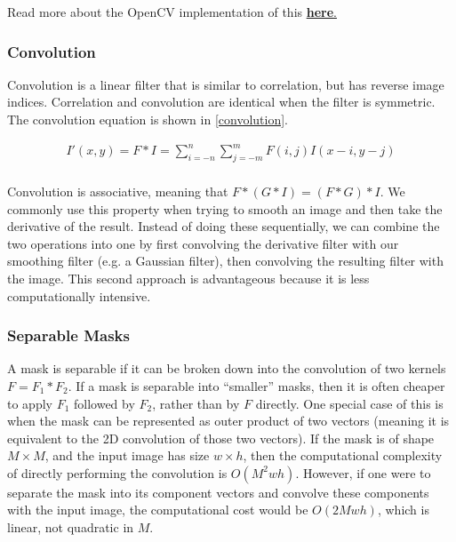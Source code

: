 \documentclass[twoside]{article}
\begin{document}
Read more about the OpenCV implementation of this  \href{https://docs.opencv.org/3.1.0/d4/d86/group__imgproc__filter.html#gaabe8c836e97159a9193fb0b11ac52cf1}{\textbf{here}.} 

\subsubsection{Convolution}
Convolution is a linear filter that is similar to correlation, but has reverse image indices. Correlation and convolution are identical when the filter is symmetric. The convolution equation is shown in \ref{convolution}.

\begin{equation}
  \label{convolution}
  \begin{aligned}
    I'(x,y) = F * I = \sum_{i=-n}^n \sum_{j=-m}^m F(i,j)I(x-i,y-j)\\
  \end{aligned}
\end{equation}

Convolution is associative, meaning that $F*(G*I) = (F*G)*I$. We commonly use this property when trying to smooth an image and then take the derivative of the result. Instead of doing these sequentially, we can combine the two operations into one by first convolving the derivative filter with our smoothing filter (e.g. a Gaussian filter), then convolving the resulting filter with the image. This second approach is advantageous because it is less computationally intensive.




\subsubsection{Separable Masks}
A mask is separable if it can be broken down into the convolution of two kernels $F = F_1 * F_2$. If a mask is separable into ``smaller'' masks, then it is often cheaper to apply $F_1$ followed by $F_2$, rather than by $F$ directly. One special case of this is when the mask can be represented as outer product of two vectors (meaning it is equivalent to the 2D convolution of those two vectors). If the mask is of shape $M\times M$, and the input image has size $w\times h$, then the computational complexity of directly performing the convolution is $O(M^2wh)$. However, if one were to separate the mask into its component vectors and convolve these components with the input image, the computational cost would be $O(2Mwh)$, which is linear, not quadratic in $M$. 
\end{document}
